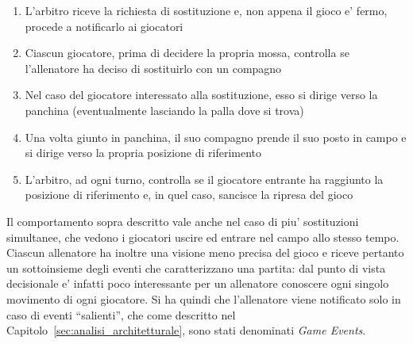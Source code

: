 \begin{enumerate}
	\item L'arbitro riceve la richiesta di sostituzione e, non appena il gioco e' fermo, procede a notificarlo ai giocatori
	\item Ciascun giocatore, prima di decidere la propria mossa, controlla se l'allenatore ha deciso di sostituirlo con un compagno
	\item Nel caso del giocatore interessato alla sostituzione, esso si dirige verso la panchina (eventualmente lasciando la palla dove si trova)
	\item Una volta giunto in panchina, il suo compagno prende il suo posto in campo e si dirige verso la propria posizione di riferimento
	\item L'arbitro, ad ogni turno, controlla se il giocatore entrante ha raggiunto la posizione di riferimento e, in quel caso, sancisce la ripresa del gioco
\end{enumerate}

Il comportamento sopra descritto vale anche nel caso di piu' sostituzioni simultanee, che vedono i giocatori uscire ed entrare nel campo allo stesso tempo.\\

Ciascun allenatore ha inoltre una visione meno precisa del gioco e riceve pertanto un sottoinsieme degli eventi che caratterizzano una partita: dal punto di vista decisionale e' infatti poco interessante per un allenatore conoscere ogni singolo movimento di ogni giocatore. Si ha quindi che l'allenatore viene notificato solo in caso di eventi ``salienti'', che come descritto nel Capitolo~\ref{sec:analisi_architetturale}, sono stati denominati \textit{Game Events}.

%
%
